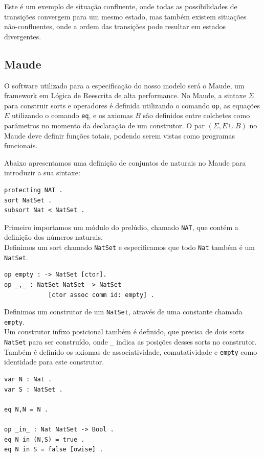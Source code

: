 Este é um exemplo de situação confluente, onde todas as possibilidades de transições convergem para um mesmo estado, mas também existem situações não-confluentes, onde a ordem das transições pode resultar em estados divergentes.

\subsection{Maude} \label{sec:chap2sub1}

O software utilizado para a especificação do nosso modelo será o Maude, um framework em Lógica de Reescrita de alta performance.
No Maude, a sintaxe $\Sigma$ para construir sorts e operadores é definida utilizando o comando \texttt{op}, as equações $E$ utilizando o comando \texttt{eq}, e os axiomas $B$ são definidos entre colchetes como parâmetros no momento da declaração de um construtor.
O par $(\Sigma, E \cup B)$ no Maude deve definir funções totais, podendo serem vistas como programas funcionais.

Abaixo apresentamos uma definição de conjuntos de naturais no Maude para introduzir a sua sintaxe:

\begin{verbatim}
protecting NAT .
sort NatSet .
subsort Nat < NatSet .
\end{verbatim}

\noindent
Primeiro importamos um módulo do prelúdio, chamado \texttt{NAT}, que contém a definição dos números naturais. \\
Definimos um sort chamado \texttt{NatSet} e especificamos que todo \texttt{Nat} também é um \texttt{NatSet}.

\begin{verbatim}
op empty : -> NatSet [ctor].
op _,_ : NatSet NatSet -> NatSet 
            [ctor assoc comm id: empty] .
\end{verbatim}

\noindent
Definimos um construtor de um \texttt{NatSet}, através de uma constante chamada \texttt{empty}. \\
Um construtor infixo posicional também é definido, que precisa de dois sorts \texttt{NatSet} para ser construído, onde \texttt{\_} indica as posições desses sorts no construtor. Também é definido os axiomas de associatividade, comutatividade e \texttt{empty} como identidade para este construtor.

\begin{verbatim}
var N : Nat .
var S : NatSet .

eq N,N = N .

op _in_ : Nat NatSet -> Bool .
eq N in (N,S) = true .
eq N in S = false [owise] .
\end{verbatim}

